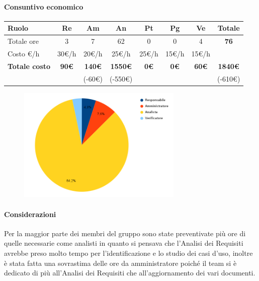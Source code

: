 \paragraph{Consuntivo economico}
\begin{center}
	\renewcommand{\arraystretch}{1.8}
	\begin{tabular}{ |m{6em}|c|c|c|c|c|c|c| }
	\hline
	\textbf{Ruolo} & \textbf{Re} & \textbf{Am} &  \textbf{An} &  \textbf{Pt} &  \textbf{Pg} &  \textbf{Ve} &  \textbf{Totale}\\
    \hline
    Totale ore & 3 & 7 & 62 & 0 & 0 & 4 & \textbf{76}\\
    \hline
    Costo \euro/h & 30\euro/h & 20\euro/h & 25\euro/h & 25\euro/h & 15\euro/h & 15\euro/h & \\
    \hline
    \textbf{Totale costo} & \textbf{90\euro} & \textbf{140\euro} &  \textbf{1550\euro} & \textbf{0\euro} &  \textbf{0\euro} &  \textbf{60\euro} &  \textbf{1840\euro} \\
    &  & (-60\euro) & (-550\euro) &  &  &  & (-610\euro) \\
    \hline
	\end{tabular}

    \begin{figure}[H]
        \centering\includegraphics[width=0.7\textwidth, height=0.7\textheight, keepaspectratio]{images/consuntivo/RTB-requisiti-costo.png}
    \end{figure}
\end{center}

\paragraph{Considerazioni} \hfill \break
Per la maggior parte dei membri del gruppo sono state preventivate più ore di quelle necessarie come analisti in quanto 
si pensava che l'Analisi dei Requisiti avrebbe preso molto tempo per l'identificazione e lo studio dei casi d'uso, inoltre è stata
fatta una sovrastima delle ore da amministratore poiché il team si è dedicato di più all'Analisi dei Requisiti 
che all'aggiornamento dei vari documenti.

